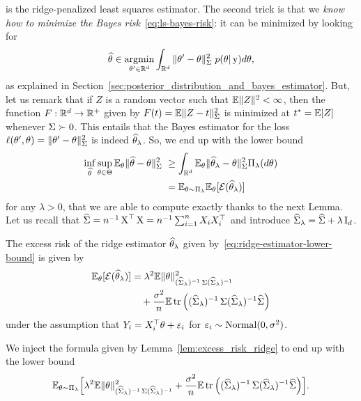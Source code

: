 is the ridge-penalized least squares estimator.
The second trick is that we \emph{know how to minimize the Bayes risk}~\eqref{eq:ls-bayes-risk}: it can be minimized by looking for
\begin{equation*}
	\widehat \theta \in \operatorname*{argmin}_{\theta' \in \mathbb R^d} \int_{\mathbb R^d} \| \theta' - \theta \|_{\operatorname{\boldsymbol \Sigma}}^2 \; p(\theta | \operatorname{{\boldsymbol y}}) d \theta,
\end{equation*}
as explained in Section~\ref{sec:posterior_distribution_and_bayes_estimator}.
But, let us remark that if $Z$ is a random vector such that $\mathbb E \| Z \|^2 < \infty$, then the function $F : \mathbb R^d \rightarrow \mathbb R^+$ given 
by $F(t) = \mathbb E \| Z - t \|_{\operatorname{\boldsymbol \Sigma}}^2$ is minimized at $t^* = \mathbb E[Z]$ whenever 
$\operatorname{\boldsymbol \Sigma} \succ 0$.
This entails that the Bayes estimator for the loss $\ell(\theta', \theta) = \| \theta' - \theta \|_{\operatorname{\boldsymbol \Sigma}}^2$ is indeed $\widehat \theta_\lambda$.
So, we end up with the lower bound 
\begin{align*}
	\inf_{\wh \theta} \sup_{\theta \in \Theta} \E_\theta 
	\norm{\wh \theta - \theta}_{\bSigma}^2 &\geq 
	\int_{\R^d} \E_\theta \norm{\wh \theta_\lambda - \theta}_{\bSigma}^2 \Pi_\lambda(d \theta) \\
	&= \E_{\theta \sim \Pi_\lambda} \E_\theta [\cE(\wh \theta_\lambda)]
\end{align*}
for any $\lambda > 0$, that we are able to compute exactly thanks to the next Lemma.
Let us recall that $\widehat {\operatorname{\boldsymbol \Sigma}} = n^{-1} \operatorname{{\boldsymbol X}}^\top \operatorname{{\boldsymbol X}} = n^{-1} \sum_{i=1}^n X_i X_i^\top$ and introduce $\widehat {\operatorname{\boldsymbol \Sigma}}_\lambda = \widehat {\operatorname{\boldsymbol \Sigma}} + \lambda \operatorname{{\boldsymbol I}}_d$.
\begin{lemma}
	\label{lem:excess_risk_ridge}
	The excess risk of the ridge estimator $\widehat \theta_\lambda$ given by~\eqref{eq:ridge-estimator-lower-bound} is given by
	\begin{align*}
		\mathbb E_\theta [\operatorname{{\mathcal E}}(\widehat \theta_\lambda)] &= \lambda^2 \mathbb E \| \theta \|_{(\widehat {\operatorname{\boldsymbol \Sigma}}_\lambda)^{-1} \operatorname{\boldsymbol \Sigma} (\widehat {\operatorname{\boldsymbol \Sigma}}_\lambda)^{-1}}^2 \\
		& \quad + \frac{\sigma^2}{n} \mathbb E \operatorname{tr} \Big( (\widehat {\operatorname{\boldsymbol \Sigma}}_\lambda)^{-1} \operatorname{\boldsymbol \Sigma} (\widehat {\operatorname{\boldsymbol \Sigma}}_\lambda)^{-1} \widehat {\operatorname{\boldsymbol \Sigma}} \Big)
	\end{align*}
	under the assumption that $Y_i = X_i^\top \theta + \varepsilon_i$ for $\varepsilon_i \sim \operatorname{Normal}(0, \sigma^2)$.
\end{lemma}
We inject the formula given by Lemma~\ref{lem:excess_risk_ridge} to end up with the lower bound
\begin{equation*}
	\mathbb E_{\theta \sim \Pi_\lambda} \Big[ \lambda^2 \mathbb E \| \theta \|_{(\widehat {\operatorname{\boldsymbol \Sigma}}_\lambda)^{-1} \operatorname{\boldsymbol \Sigma} (\widehat {\operatorname{\boldsymbol \Sigma}}_\lambda)^{-1}}^2  + \frac{\sigma^2}{n} \mathbb E \operatorname{tr} \Big( (\widehat {\operatorname{\boldsymbol \Sigma}}_\lambda)^{-1} \operatorname{\boldsymbol \Sigma} (\widehat {\operatorname{\boldsymbol \Sigma}}_\lambda)^{-1} \widehat {\operatorname{\boldsymbol \Sigma}} \Big) \Big].
\end{equation*}

